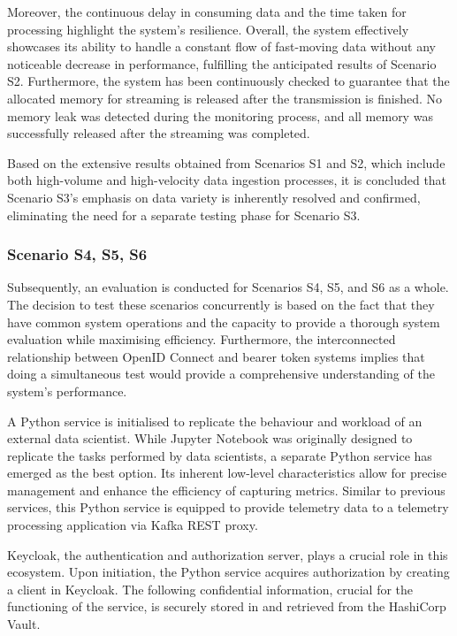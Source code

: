 \documentclass{ieeeaccess}
\begin{document}
Moreover, the continuous delay in consuming data and the time taken for processing highlight the system's resilience. Overall, the system effectively showcases its ability to handle a constant flow of fast-moving data without any noticeable decrease in performance, fulfilling the anticipated results of Scenario S2. Furthermore, the system has been continuously checked to guarantee that the allocated memory for streaming is released after the transmission is finished. No memory leak was detected during the monitoring process, and all memory was successfully released after the streaming was completed.

Based on the extensive results obtained from Scenarios S1 and S2, which include both high-volume and high-velocity data ingestion processes, it is concluded that Scenario S3's emphasis on data variety is inherently resolved and confirmed, eliminating the need for a separate testing phase for Scenario S3.

\subsubsection{Scenario S4, S5, S6}

Subsequently, an evaluation is conducted for Scenarios S4, S5, and S6 as a whole. The decision to test these scenarios concurrently is based on the fact that they have common system operations and the capacity to provide a thorough system evaluation while maximising efficiency. Furthermore, the interconnected relationship between OpenID Connect and bearer token systems implies that doing a simultaneous test would provide a comprehensive understanding of the system's performance.

A Python service is initialised to replicate the behaviour and workload of an external data scientist. While Jupyter Notebook was originally designed to replicate the tasks performed by data scientists, a separate Python service has emerged as the best option. Its inherent low-level characteristics allow for precise management and enhance the efficiency of capturing metrics. Similar to previous services, this Python service is equipped to provide telemetry data to a telemetry processing application via Kafka REST proxy. 

Keycloak, the authentication and authorization server, plays a crucial role in this ecosystem. Upon initiation, the Python service acquires authorization by creating a client in Keycloak. The following confidential information, crucial for the functioning of the service, is securely stored in and retrieved from the HashiCorp Vault. 
\end{document}
